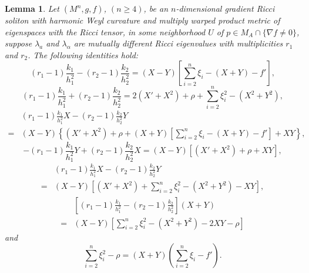 \documentclass{amsart}
\newtheorem{lemma}[theorem]{Lemma}
\theoremstyle{definition}
\theoremstyle{remark}
\numberwithin{equation}{section}
\begin{document}
\begin{lemma}\label{lemma4.1}	
	Let $(M^n, g, f)$, $(n\geq 4)$, be an $n$-dimensional gradient Ricci soliton with harmonic Weyl curvature  and multiply warped product metric of eigenspaces with the Ricci tensor,
in some neighborhood $U$ of $p\in M_A \cap \{ \nabla f \neq 0  \}$, 
suppose $\lambda_a$ and $\lambda_\alpha$ are mutually different Ricci eigenvalues with multiplicities $r_1$ and $r_2$.
The following identities hold:
\begin{equation}\label{4.6}
(r_1-1)\frac{k_1}{h^2_1}-(r_2-1)\frac{k_2}{h^2_2}=(X-Y)\left[ \sum^n_{i=2}\xi_i-(X+Y)-f' \right],
\end{equation}
\begin{equation}\label{4.7}
 (r_1-1)\frac{k_1}{h^2_1}+ (r_2-1)\frac{k_2}{h^2_2}
 =2(X'+X^2 ) +\rho+\sum^n_{i=2}\xi^2_i-(X^2+Y^2),
\end{equation}
\begin{equation}\label{4.8}
\begin{aligned}
&(r_1-1)\frac{k_1}{h^2_1}X- (r_2-1)\frac{k_2}{h^2_2}Y\\
=&(X-Y)\left\{ (X'+X^2 ) +\rho+(X+Y)\left[ \sum^n_{i=2}\xi_i-(X+Y) -f'\right]+XY\right\},
\end{aligned}
\end{equation}
\begin{equation}\label{4.9}
-(r_1-1)\frac{k_1}{h^2_1}Y+(r_2-1)\frac{k_2}{h^2_2}X
=(X-Y)[(X'+X^2 )+\rho+XY],
\end{equation}
\begin{equation}\label{4.10}
\begin{aligned}
&(r_1-1)\frac{k_1}{h^2_1}X- (r_2-1)\frac{k_2}{h^2_2}Y\\
=&(X-Y)\left[(X'+X^2 )+\sum^n_{i=2}\xi^2_i-(X^2+Y^2)-XY\right],
\end{aligned}
\end{equation}
\begin{equation}\label{4.11}
\begin{aligned}
&\left[(r_1-1)\frac{k_1}{h^2_1}- (r_2-1)\frac{k_2}{h^2_2} \right](X+Y)\\
=&(X-Y)\left[\sum^n_{i=2}\xi^2_i-(X^2+Y^2)-2XY-\rho \right]
\end{aligned}
\end{equation}	
and 
 \begin{equation}\label{4.12}
 \sum^n_{i=2}\xi^2_i-\rho=(X+Y)\left( \sum^n_{i=2}\xi_i -f' \right).
 \end{equation}
\end{lemma}
\end{document}
